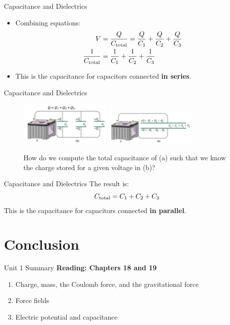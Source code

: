 \documentclass{beamer}
\begin{document}
\begin{frame}{Capacitance and Dielectrics}
\begin{itemize}
\item Combining equations:
\begin{align}
V &= \frac{Q}{C_{\rm total}} = \frac{Q}{C_1}+\frac{Q}{C_2}+\frac{Q}{C_3} \\
\frac{1}{C_{\rm total}} &= \frac{1}{C_1}+\frac{1}{C_2}+\frac{1}{C_3}
\end{align}
\item This is the capacitance for capacitors connected \textbf{in series}.
\end{itemize}
\end{frame}

\begin{frame}{Capacitance and Dielectrics}
\begin{figure}
\centering
\includegraphics[width=0.4\textwidth]{figures/cap3.png} \hspace{0.2cm}
\includegraphics[width=0.4\textwidth]{figures/cap4.png}
\caption{\label{fig:cap2} How do we compute the total capacitance of (a) such that we know the charge stored for a given voltage in (b)?}
\end{figure}
\end{frame}

\begin{frame}{Capacitance and Dielectrics}
The result is:
\begin{equation}
C_{\rm total} = C_1+C_2+C_3
\end{equation}
This is the capacitance for capacitors connected \textbf{in parallel}.
\end{frame}

\section{Conclusion}

\begin{frame}{Unit 1 Summary}
\textbf{Reading: Chapters 18 and 19}
\begin{enumerate}
\item Charge, mass, the Coulomb force, and the gravitational force
\item Force fields
\item Electric potential and capacitance
\end{enumerate}
\end{frame}
\end{document}
